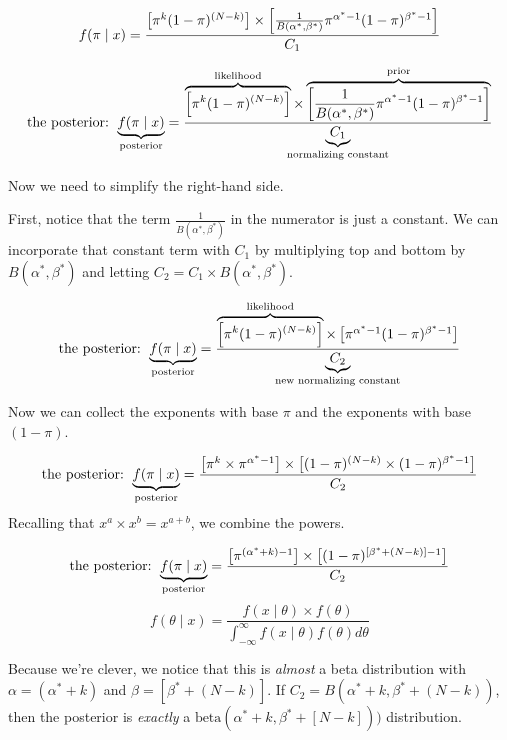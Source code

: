 \documentclass[
]{book}
\begin{document}
\[
\displaystyle f(\pi \mid x) = \frac{\left[ \pi^{k} (1 - \pi)^{(N - k) }\right] \times \left[ \frac{1}{B(\alpha^*, \beta^*)} \pi^{\alpha^* - 1}(1 - \pi)^{\beta^* - 1} \right]}{ C_1} \\
\]

\[
\text{the posterior: } \displaystyle \underbrace{f(\pi \mid x)}_{\text{posterior}} = \frac{\overbrace{\left[ \pi^{k} (1 - \pi)^{(N - k) }\right] }^{\text{likelihood}} \times \overbrace{ \left[ \frac{1}{B(\alpha^*, \beta^*)} \pi^{\alpha^* - 1}(1 - \pi)^{\beta^* - 1} \right] }^{\text{prior}}}{\displaystyle \underbrace{C_1}_{\text{normalizing constant}}} \\
\]

Now we need to simplify the right-hand side.

First, notice that the term \(\frac{1}{B(\alpha^*, \beta^*)}\) in the numerator is just a constant. We can incorporate that constant term with \(C_1\) by multiplying top and bottom by \(B(\alpha^*, \beta^*)\) and letting \(C_2 = C_1 \times B(\alpha^*, \beta^*)\).

\[
\text{the posterior: } \displaystyle \underbrace{f(\pi \mid x)}_{\text{posterior}} = \frac{\overbrace{\left[ \pi^{k} (1 - \pi)^{(N - k) }\right] }^{\text{likelihood}} \times  \left[ \pi^{\alpha^* - 1}(1 - \pi)^{\beta^* - 1} \right] }{\displaystyle \underbrace{C_2}_{\text{new normalizing constant}}} \\
\]

Now we can collect the exponents with base \(\pi\) and the exponents with base \((1 - \pi)\).

\[
\text{the posterior: } \displaystyle \underbrace{f(\pi \mid x)}_{\text{posterior}} = \frac{\left[ \pi^{k} \times \pi^{\alpha^* - 1} \right] \times  \left[ (1 - \pi)^{(N - k) } \times (1 - \pi)^{\beta^* - 1} \right] }{ C_2} \\
\]
Recalling that \(x^a \times x^b = x^{a + b}\), we combine the powers.

\[
\text{the posterior: } \displaystyle \underbrace{f(\pi \mid x)}_{\text{posterior}} = \frac{\left[ \pi^{(\alpha^* + k) - 1} \right] \times  \left[ (1 - \pi)^{[\beta^* + (N - k)] - 1} \right] }{ C_2} \\
\]
\[
\displaystyle f(\theta \mid x) = \frac{f(x \mid \theta) \times f(\theta)}{\displaystyle \int_{-\infty}^\infty f(x \mid \theta)f(\theta) d\theta}
\]

Because we're clever, we notice that this is \emph{almost} a beta distribution with \(\alpha = (\alpha^* + k)\) and \(\beta = [\beta^* + (N - k)]\). If \(C_2 = B(\alpha^* + k, \beta^* + (N - k))\), then the posterior is \emph{exactly} a \(\text{beta}(\alpha^* + k, \beta^* + [N - k]))\) distribution.
\end{document}

